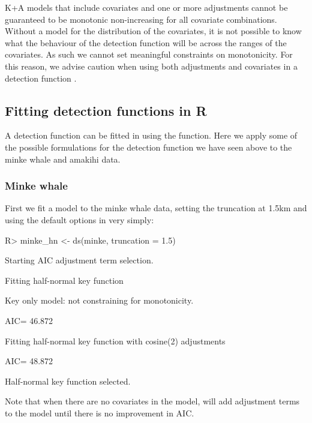 \documentclass[article]{jss}\usepackage[]{graphicx}\usepackage[]{color}
\begin{document}
K+A models that include covariates and one or more adjustments cannot be guaranteed to be monotonic non-increasing for all covariate combinations. Without a model for the distribution of the covariates, it is not possible to know what the behaviour of the detection function will be across the ranges of the covariates. As such we cannot set meaningful constraints on monotonicity. For this reason, we advise caution when using both adjustments and covariates in a detection function \citep[see][for an example of when this can be problematic and an alternative detection function formulation to solve this issue]{Miller:2015hw}.


\subsection{Fitting detection functions in R}

A detection function can be fitted in  using the  function. Here we apply some of the possible formulations for the detection function we have seen above to the minke whale and amakihi data.

\subsubsection{Minke whale}

First we fit a model to the minke whale data, setting the truncation at 1.5km and using the default options in  very simply:
\begin{Schunk}
\begin{Sinput}
R> minke_hn <- ds(minke, truncation = 1.5)
\end{Sinput}
\begin{Soutput}
Starting AIC adjustment term selection.
\end{Soutput}
\begin{Soutput}
Fitting half-normal key function
\end{Soutput}
\begin{Soutput}
Key only model: not constraining for monotonicity.
\end{Soutput}
\begin{Soutput}
AIC= 46.872
\end{Soutput}
\begin{Soutput}
Fitting half-normal key function with cosine(2) adjustments
\end{Soutput}
\begin{Soutput}
AIC= 48.872
\end{Soutput}
\begin{Soutput}

Half-normal key function selected.
\end{Soutput}
\end{Schunk}
Note that when there are no covariates in the model,  will add adjustment terms to the model until there is no improvement in AIC.
\end{document}
